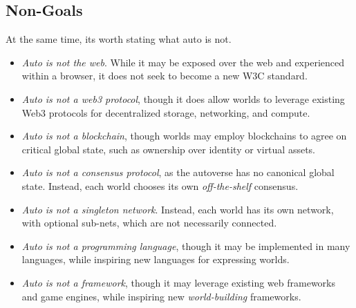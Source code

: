 \documentclass[twocolumn, 10pt]{article}
\begin{document}
\subsection{Non-Goals}

At the same time, its worth stating what auto is not.

\begin{itemize}
    \item \textit{Auto is not the web}. While it may be exposed over the web and experienced within a browser, it does not seek to become a new W3C standard.
    \item \textit{Auto is not a web3 protocol}, though it does allow worlds to leverage existing Web3 protocols for decentralized storage, networking, and compute.
    \item \textit{Auto is not a blockchain}, though worlds may employ blockchains to agree on critical global state, such as ownership over identity or virtual assets.
    \item \textit{Auto is not a consensus protocol}, as the autoverse has no canonical global state. Instead, each world chooses its own \textit{off-the-shelf} consensus.
    \item \textit{Auto is not a singleton network}. Instead, each world has its own network, with optional sub-nets, which are not necessarily connected.
    \item \textit{Auto is not a programming language}, though it may be implemented in many languages, while inspiring new languages for expressing worlds.
    \item \textit{Auto is not a framework}, though it may leverage existing web frameworks and game engines, while inspiring new \textit{world-building} frameworks.
\end{itemize}
\end{document}
